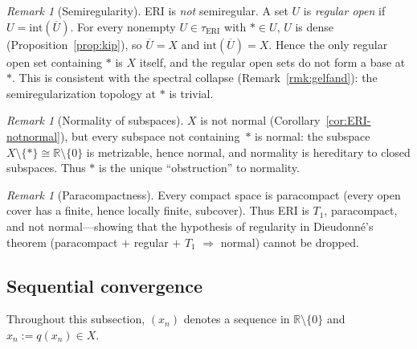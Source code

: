 \documentclass[11pt]{article}
\theoremstyle{definition}
\theoremstyle{remark}
\newtheorem{remark}[theorem]{Remark}
\begin{document}
\begin{remark}[Semiregularity]\label{rmk:semiregular}
ERI is \emph{not} semiregular.
A set $U$ is \emph{regular open} if
$U = \mathrm{int}(\overline{U})$.
For every nonempty $U \in \tau_{\mathrm{ERI}}$ with $\ast \in U$,
$U$ is dense (Proposition~\ref{prop:kip}), so
$\overline{U} = X$ and $\mathrm{int}(\overline{U}) = X$.
Hence the only regular open set containing $\ast$ is $X$ itself,
and the regular open sets do not form a base at~$\ast$.
This is consistent with the spectral collapse
(Remark~\ref{rmk:gelfand}): the semiregularization topology at
$\ast$ is trivial.
\end{remark}

\begin{remark}[Normality of subspaces]\label{rmk:normalsubspaces}
$X$ is not normal (Corollary~\ref{cor:ERI-notnormal}), but every
subspace not containing~$\ast$ is normal: the subspace
$X \setminus \{\ast\} \cong \mathbb{R}\setminus\{0\}$ is
metrizable, hence normal, and normality is hereditary to
closed subspaces.
Thus $\ast$ is the unique ``obstruction'' to normality.
\end{remark}

\begin{remark}[Paracompactness]\label{rmk:paracompact}
Every compact space is paracompact (every open cover has a finite,
hence locally finite, subcover).
Thus ERI is $T_1$, paracompact, and not normal---showing that
the hypothesis of regularity in Dieudonn\'{e}'s theorem
(paracompact $+$ regular $+$ $T_1$ $\Rightarrow$ normal) cannot
be dropped.
\end{remark}

\subsection{Sequential convergence}

Throughout this subsection, $(x_n)$ denotes a sequence in
$\mathbb{R}\setminus\{0\}$ and $\hat{x}_n := q(x_n) \in X$.
\end{document}
